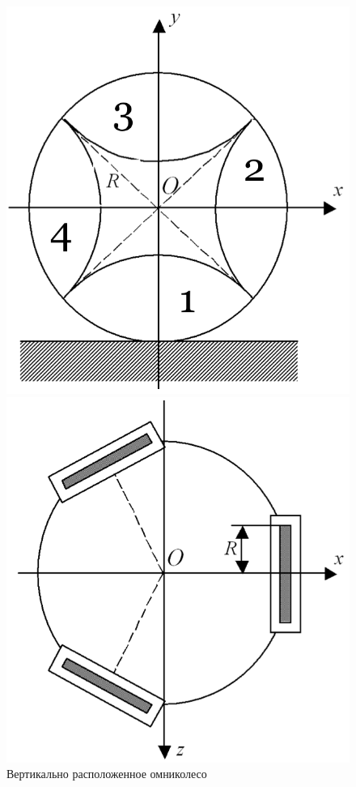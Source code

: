 \documentclass[12pt]{article}
\begin{document}
\begin{figure}
\centering
\begin{minipage}{.47\textwidth}
    \centering
    \includegraphics[width=\textwidth]{content/parts/3_friction/diploma/img/art/kos1_wheel_side.png}
    \caption{Вертикально расположенное омниколесо}
    \label{fig:kos1_wheel_side}
\end{minipage}%
\hspace{5pt}
\begin{minipage}{.47\textwidth}
    \centering
    \includegraphics[width=\textwidth]{content/parts/3_friction/diploma/img/art/kos2_vehicle.png}

\end{minipage}
\end{figure}
\end{document}
